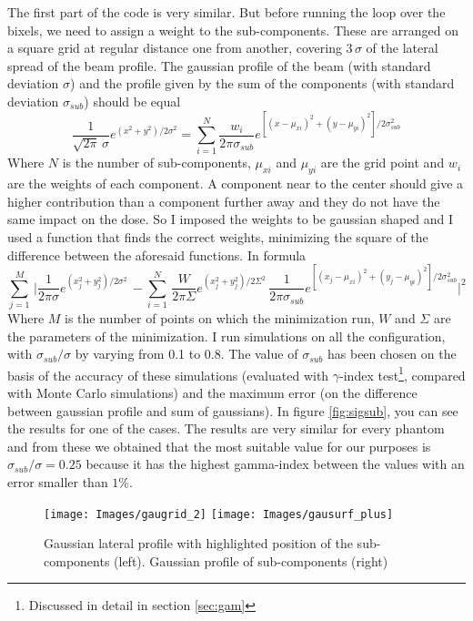 \documentclass[12pt, a4paper, twoside]{book}
\begin{document}
The first part of the code is very similar. But before running the loop over the bixels, we need to assign a weight to the sub-components. These are arranged on a square grid at regular distance one from another, covering $3\,\sigma$ of the lateral spread of the beam profile. 
The gaussian profile of the beam (with standard deviation $\sigma$) and the profile given by the sum of the components (with standard deviation $\sigma_{sub}$) should be equal
\[
\frac{1}{\sqrt{2 \pi}\,\sigma}e^{(x^2+y^2)/2\sigma^2} = \sum_{i=1}^N \frac{w_i}{2 \pi\sigma_{sub}}e^{[(x-\mu_{xi})^2+(y-\mu_{yi})^2]/2\sigma_{sub}^2}
\]
Where $N$ is the number of sub-components, $\mu_{xi}$ and $\mu_{yi}$ are the grid point and $w_i$ are the weights of each component.
A component near to the center should give a higher contribution than a component further away and they do not have the same impact on the dose. So I imposed the weights to be gaussian shaped and I used a function that finds the correct weights, minimizing the square of the difference between the aforesaid functions.
In formula
\[
\sum^M_{j=1}\, \bigg|\frac{1}{2\pi\sigma}e^{(x_j^2+y_j^2)/2\sigma^2}\, - \sum^N_{i=1} \,\frac{W}{2\pi\Sigma}e^{(x_j^2+y_j^2)/2\Sigma^2} \,\frac{1}{2\pi\sigma_{sub}}e^{[(x_j-\mu_{xi})^2+(y_j-\mu_{yi})^2]/2\sigma_{sub}^2} \bigg|^2
\]
Where $M$ is the number of points on which the minimization run, $W$ and $\Sigma$ are the parameters of the minimization.
I run simulations on all the configuration, with $\sigma_{sub}/\sigma$ by varying from 0.1 to 0.8. 
The value of $\sigma_{sub}$ has been chosen on the basis of the accuracy of these simulations (evaluated with $\gamma$-index test\footnote{Discussed in detail in section \ref{sec:gam}}, compared with Monte Carlo simulations) and the maximum error (on the difference between gaussian profile and sum of gaussians).
In figure \ref{fig:sigsub}, you can see the results for one of the cases. The results are very similar for every phantom and from these we obtained that the most suitable value for our purposes is $\sigma_{sub}/\sigma=0.25$ because it has the highest gamma-index between the values with an error smaller than $1\%$.
\begin{figure}[t]
{\texttt{[image: Images/gaugrid\_2]}}
{\texttt{[image: Images/gausurf\_plus]}}
\caption{Gaussian lateral profile with highlighted position of the sub-components (left). Gaussian profile of sub-components (right)}
\label{fig:gaugrid}
\end{figure}

\end{document}

